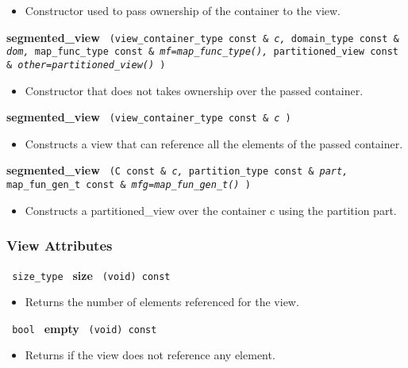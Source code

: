 \begin{itemize}
\item
Constructor used to pass ownership of the container to the view.
\end{itemize}

\noindent
\textbf{segmented\_view}%
\texttt{%
(view\_container\_type const \&
\textit{c,}%
domain\_type const \&
\textit{dom,}%
map\_func\_type const \&
\textit{mf=map\_func\_type(),}%
partitioned\_view const \&
\textit{other=partitioned\_view()}%
)
}

\begin{itemize}
\item
Constructor that does not takes ownership over the passed container.
\end{itemize}

\noindent
\textbf{segmented\_view}%
\texttt{%
(view\_container\_type const \&
\textit{c}%
)
}

\begin{itemize}
\item
Constructs a view that can reference all the elements of the passed container.
\end{itemize}

\noindent
\textbf{segmented\_view}%
\texttt{%
(C const \&
\textit{c,}%
partition\_type const \&
\textit{part,}%
map\_fun\_gen\_t
const \&
\textit{mfg=map\_fun\_gen\_t()}%
)
}

\begin{itemize}
\item
Constructs a partitioned\_view over the container c using the partition part.
\end{itemize}

\subsubsection{ View Attributes}

\noindent
\texttt{%
size\_type
}
\newline
\textbf{size}%
\texttt{%
(void) const
}

\begin{itemize}
\item
Returns the number of elements referenced for the view.
\end{itemize}

\noindent
\texttt{%
bool
}
\newline
\textbf{empty}%
\texttt{%
(void) const
}

\begin{itemize}
\item
Returns if the view does not reference any element.
\end{itemize}

